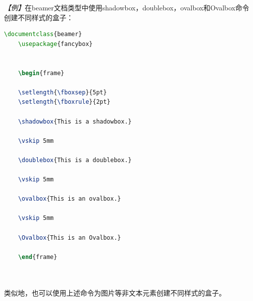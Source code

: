 \emph{【例】}在beamer文档类型中使用shadowbox，doublebox，ovalbox和Ovalbox命令创建不同样式的盒子：
\begin{lstlisting}[language=TeX]
    \documentclass{beamer}
    \usepackage{fancybox}
    

    \begin{frame}

    \setlength{\fboxsep}{5pt}
    \setlength{\fboxrule}{2pt}

    \shadowbox{This is a shadowbox.}

    \vskip 5mm

    \doublebox{This is a doublebox.}

    \vskip 5mm

    \ovalbox{This is an ovalbox.}

    \vskip 5mm

    \Ovalbox{This is an Ovalbox.}

    \end{frame}

    
\end{lstlisting}

类似地，也可以使用上述命令为图片等非文本元素创建不同样式的盒子。

